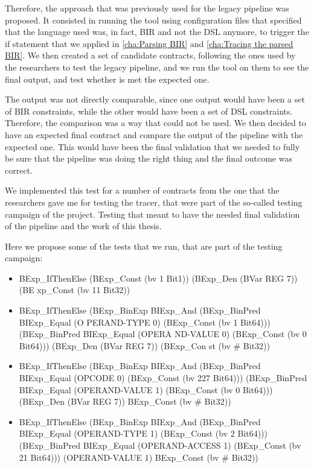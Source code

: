 Therefore, the approach that was previously used for the legacy pipeline was
proposed. It consisted in running the tool using configuration files that specified
that the language used was, in fact, BIR and not the DSL anymore, to trigger the
if statement that we applied in \ref{cha:Parsing BIR} and
\ref{cha:Tracing the parsed BIR}. We then created a set of candidate contracts,
following the ones used by the researchers to test the legacy pipeline, and we run
the tool on them to see the final output, and test whether is met the expected
one.

The output was not directly comparable, since one output would have been a set of
BIR constraints, while the other would have been a set of DSL constraints. Therefore,
the comparison was a way that could not be used. We then decided to have an expected
final contract and compare the output of the pipeline with the expected one.
This would have been the final validation that we needed to fully be sure that
the pipeline was doing the right thing and the final outcome was correct.

We implemented this test for a number of contracts from the one that the
researchers gave me for testing the tracer, that were part of the so-called testing
campaign of the project. Testing that meant to have the needed final validation
of the pipeline and the work of this thesis.

Here we propose some of the tests that we run, that are part of the testing campaign:
\begin{itemize}
  \item BExp\_IfThenElse (BExp\_Const (bv 1 Bit1)) (BExp\_Den (BVar REG 7)) (BE
    xp\_Const (bv 11 Bit32))

  \item BExp\_IfThenElse (BExp\_BinExp BIExp\_And (BExp\_BinPred BIExp\_Equal (O
    PERAND-TYPE 0) (BExp\_Const (bv 1 Bit64))) (BExp\_BinPred BIExp\_Equal (OPERA
    ND-VALUE 0) (BExp\_Const (bv 0 Bit64))) (BExp\_Den (BVar REG 7)) (BExp\_Con st
    (bv \# Bit32))

  \item BExp\_IfThenElse (BExp\_BinExp BIExp\_And (BExp\_BinPred BIExp\_Equal (OPCODE
    0) (BExp\_Const (bv 227 Bit64))) (BExp\_BinPred BIExp\_Equal (OPERAND-VALUE
    1) (BExp\_Const (bv 0 Bit64))) (BExp\_Den (BVar REG 7)) BExp\_Const (bv \# Bit32))

  \item BExp\_IfThenElse (BExp\_BinExp BIExp\_And (BExp\_BinPred BIExp\_Equal (OPERAND-TYPE
    1) (BExp\_Const (bv 2 Bit64))) (BExp\_BinPred BIExp\_Equal (OPERAND-ACCESS 1)
    (BExp\_Const (bv 21 Bit64))) (OPERAND-VALUE 1) BExp\_Const (bv \# Bit32))
\end{itemize}

